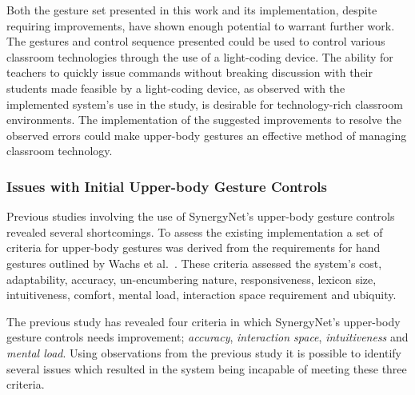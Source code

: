 \documentclass[link]{IWCOMP}
\begin{document}
Both the gesture set presented in this work and its implementation, despite requiring improvements, have shown enough potential to warrant further work.
The gestures and control sequence presented could be used to control various classroom technologies through the use of a light-coding device.
The ability for teachers to quickly issue commands without breaking discussion with their students made feasible by a light-coding device, as observed with the implemented system's use in the study, is desirable for technology-rich classroom environments.
The implementation of the suggested improvements to resolve the observed errors could make upper-body gestures an effective method of managing classroom technology.




\subsubsection{Issues with Initial Upper-body Gesture Controls}
\label{subsubsec:pilotdiscussionIssues}

Previous studies involving the use of SynergyNet's upper-body gesture controls revealed several shortcomings.
To assess the existing implementation a set of criteria for upper-body gestures was derived from the requirements for hand gestures outlined by Wachs et al.~\cite{Wachs2011}.
These criteria assessed the system's cost, adaptability, accuracy, un-encumbering nature, responsiveness, lexicon size, intuitiveness, comfort, mental load, interaction space requirement and ubiquity.

The previous study has revealed four criteria in which SynergyNet's upper-body gesture controls needs improvement; 
\textit{accuracy}, \textit{interaction space}, \textit{intuitiveness} and \textit{mental load}.
Using observations from the previous study it is possible to identify several issues which resulted in the system being incapable of meeting these three criteria.
\end{document}
